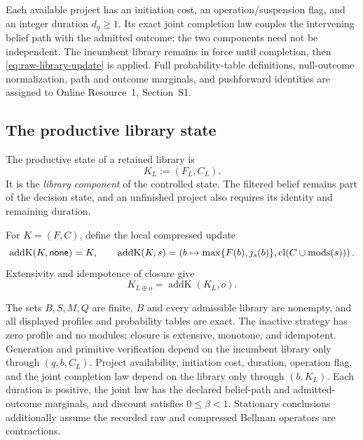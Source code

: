 Each available project has an initiation cost, an operation/suspension flag,
and an integer duration \(d_q\geq1\).  Its exact joint completion law couples
the intervening belief path with the admitted outcome; the two components need
not be independent.  The incumbent library remains in force until completion,
then \eqref{eq:raw-library-update} is applied.  Full probability-table
definitions, null-outcome normalization, path and outcome marginals, and
pushforward identities are assigned to Online Resource~1, Section~S1.

\subsection{The productive library state}

\begin{definition}
\label{def:finite-library-state}
The productive state of a retained library is
\begin{equation}
  K_L:=(F_L,C_L).
  \label{eq:closure-compression}
\end{equation}
It is the \emph{library component} of the controlled state.  The filtered
belief remains part of the decision state, and an unfinished project also
requires its identity and remaining duration.
\end{definition}

For \(K=(F,C)\), define the local compressed update
\[
 \operatorname{addK}(K,\mathsf{none})=K,
 \qquad
 \operatorname{addK}(K,s)=
 \left(b\mapsto\max\{F(b),j_s(b)\},
       \operatorname{cl}(C\cup\operatorname{mods}(s))\right).
\]
Extensivity and idempotence of closure give
\begin{equation}
  K_{L\oplus o}=\operatorname{addK}(K_L,o).
  \label{eq:raw-compressed-local-update}
\end{equation}

\begin{assumption}
\label{asm:aor-projection-process}
The sets \(B,S,M,Q\) are finite, \(B\) and every admissible library are
nonempty, and all displayed profiles and probability tables are exact.  The
inactive strategy has zero profile and no modules; closure is extensive,
monotone, and idempotent.  Generation and primitive verification depend on the
incumbent library only through \((q,b,C_L)\).  Project availability, initiation
cost, duration, operation flag, and the joint completion law depend on the
library only through \((b,K_L)\).  Each duration is positive, the joint law has
the declared belief-path and admitted-outcome marginals, and discount satisfies
\(0\leq\beta<1\).  Stationary conclusions additionally assume the recorded
raw and compressed Bellman operators are contractions.
\end{assumption}

